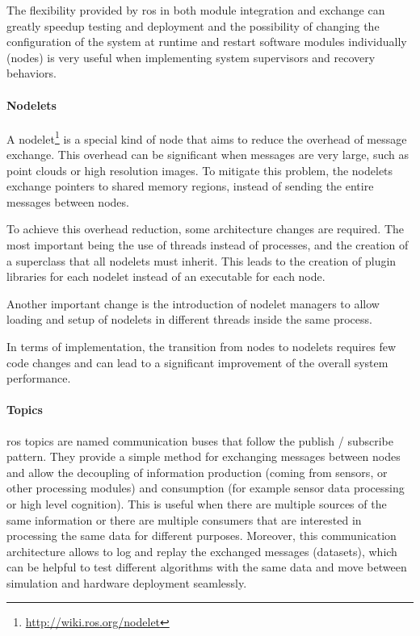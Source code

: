 The flexibility provided by \gls{ros} in both module integration and exchange can greatly speedup testing and deployment and the possibility of changing the configuration of the system at runtime and restart software modules individually (nodes) is very useful when implementing system supervisors and recovery behaviors.


\paragraph{Nodelets}

A nodelet\footnote{\url{http://wiki.ros.org/nodelet}} is a special kind of node that aims to reduce the overhead of message exchange. This overhead can be significant when messages are very large, such as point clouds or high resolution images. To mitigate this problem, the nodelets exchange pointers to shared memory regions, instead of sending the entire messages between nodes.

To achieve this overhead reduction, some architecture changes are required. The most important being the use of threads instead of processes, and the creation of a superclass that all nodelets must inherit. This leads to the creation of plugin libraries for each nodelet instead of an executable for each node.

Another important change is the introduction of nodelet managers to allow loading and setup of nodelets in different threads inside the same process.

In terms of implementation, the transition from nodes to nodelets requires few code changes and can lead to a significant improvement of the overall system performance.


\paragraph{Topics}

\gls{ros} topics are named communication buses that follow the publish / subscribe pattern. They provide a simple method for exchanging messages between nodes and allow the decoupling of information production (coming from sensors, or other processing modules) and consumption (for example sensor data processing or high level cognition). This is useful when there are multiple sources of the same information or there are multiple consumers that are interested in processing the same data for different purposes. Moreover, this communication architecture allows to log and replay the exchanged messages (datasets), which can be helpful to test different algorithms with the same data and move between simulation and hardware deployment seamlessly.

